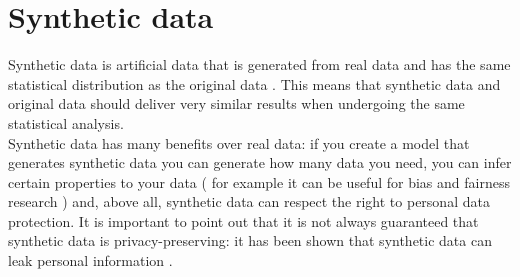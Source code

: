 \section{Synthetic data}
Synthetic data is artificial data that is generated from real data and has the same statistical distribution as the original data . This means that synthetic data and original data should deliver very similar results when undergoing the same statistical analysis. \\
Synthetic data has many benefits over real data: if you create a model that generates synthetic data you can generate how many data you need, you can infer certain properties to your data ( for example it can be useful for bias and fairness research ) and, above all, synthetic data can respect the right to personal data protection. It is important to point out that it is not always guaranteed that synthetic data is privacy-preserving: it has been shown that synthetic data can leak personal information \cite{bellovin2019privacy}.\\

